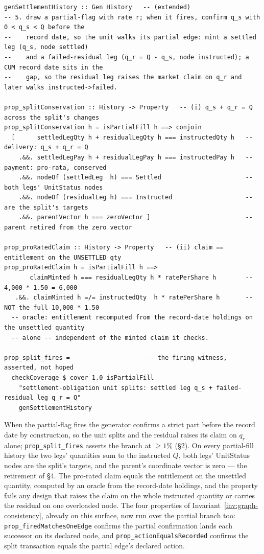 \documentclass[11pt,a4paper]{article}
\begin{document}
\begin{lstlisting}
genSettlementHistory :: Gen History   -- (extended)
-- 5. draw a partial-flag with rate r; when it fires, confirm q_s with 0 < q_s < Q before the
--    record date, so the unit walks its partial edge: mint a settled leg (q_s, node settled)
--    and a failed-residual leg (q_r = Q - q_s, node instructed); a CUM record date sits in the
--    gap, so the residual leg raises the market claim on q_r and later walks instructed->failed.

prop_splitConservation :: History -> Property   -- (i) q_s + q_r = Q across the split's changes
prop_splitConservation h = isPartialFill h ==> conjoin
  [      settledLegQty h + residualLegQty h === instructedQty h   -- delivery: q_s + q_r = Q
    .&&. settledLegPay h + residualLegPay h === instructedPay h   -- payment: pro-rata, conserved
    .&&. nodeOf (settledLeg  h) === Settled                       -- both legs' UnitStatus nodes
    .&&. nodeOf (residualLeg h) === Instructed                    --   are the split's targets
    .&&. parentVector h === zeroVector ]                          -- parent retired from the zero vector

prop_proRatedClaim :: History -> Property   -- (ii) claim == entitlement on the UNSETTLED qty
prop_proRatedClaim h = isPartialFill h ==>
       claimMinted h === residualLegQty h * ratePerShare h        -- 4,000 * 1.50 = 6,000
   .&&. claimMinted h =/= instructedQty  h * ratePerShare h       -- NOT the full 10,000 * 1.50
  -- oracle: entitlement recomputed from the record-date holdings on the unsettled quantity
  -- alone -- independent of the minted claim it checks.

prop_split_fires =                     -- the firing witness, asserted, not hoped
  checkCoverage $ cover 1.0 isPartialFill
    "settlement-obligation unit splits: settled leg q_s + failed-residual leg q_r = Q"
    genSettlementHistory
\end{lstlisting}

When the partial-flag fires the generator confirms a strict part before the record date by
construction, so the unit splits and the residual raises its claim on $q_r$ alone;
\texttt{prop\_split\_fires} asserts the branch at $\ge 1\%$ (\S 2). On every partial-fill
history the two legs' quantities sum to the instructed $Q$, both legs' UnitStatus nodes are
the split's targets, and the parent's coordinate vector is zero --- the retirement of \S4.
The pro-rated claim equals the entitlement on the unsettled quantity, computed by an oracle
from the record-date holdings, and the property fails any design that raises the claim on the
whole instructed quantity or carries the residual on one overloaded node. The four properties
of Invariant~\ref{inv:graph-consistency}, already on this surface, now run over the partial
branch too: \texttt{prop\_firedMatchesOneEdge} confirms the partial confirmation lands each
successor on its declared node, and \texttt{prop\_actionEqualsRecorded} confirms the split
transaction equals the partial edge's declared action.
\end{document}
